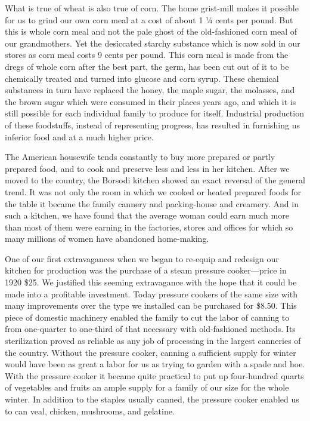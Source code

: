 \documentclass{book}
\begin{document}
What is true of wheat is also true of corn. The home grist-mill makes it possible for us to grind our own corn meal at a cost of about 1 ¼ cents per pound. But this is whole corn meal and not the pale ghost of the old-fashioned corn meal of our grandmothers. Yet the desiccated starchy substance which is now sold in our stores as corn meal costs 9 cents per pound. This corn meal is made from the dregs of whole corn after the best part, the germ, has been cut out of it to be chemically treated and turned into glucose and corn syrup. These chemical substances in turn have replaced the honey, the maple sugar, the molasses, and the brown sugar which were consumed in their places years ago, and which it is still possible for each individual family to produce for itself. Industrial production of these foodstuffs, instead of representing progress, has resulted in furnishing us inferior food and at a much higher price.

The American housewife tends constantly to buy more prepared or partly prepared food, and to cook and preserve less and less in her kitchen. After we moved to the country, the Borsodi kitchen showed an exact reversal of the general trend. It was not only the room in which we cooked or heated prepared foods for the table it became the family cannery and packing-house and creamery. And in such a kitchen, we have found that the average woman could earn much more than most of them were earning in the factories, stores and offices for which so many millions of women have abandoned home-making.

One of our first extravagances when we began to re-equip and redesign our kitchen for production was the purchase of a steam pressure cooker—price in 1920 \$25. We justified this seeming extravagance with the hope that it could be made into a profitable investment. Today pressure cookers of the same size with many improvements over the type we installed can be purchased for \$8.50. This piece of domestic machinery enabled the family to cut the labor of canning to from one-quarter to one-third of that necessary with old-fashioned methods. Its sterilization proved as reliable as any job of processing in the largest canneries of the country. Without the pressure cooker, canning a sufficient supply for winter would have been as great a labor for us as trying to garden with a spade and hoe. With the pressure cooker it became quite practical to put up four-hundred quarts of vegetables and fruits an ample supply for a family of our size for the whole winter. In addition to the staples usually canned, the pressure cooker enabled us to can veal, chicken, mushrooms, and gelatine.
\end{document}
